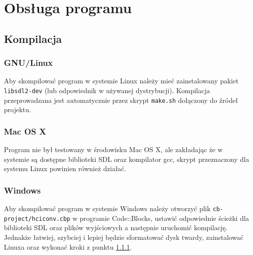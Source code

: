 \documentclass[12pt,a4paper]{article}
\newcommand{\code}[1]{\texttt{#1}}
\begin{document}
	

	\section{Obsługa programu}
		\subsection{Kompilacja}
			\subsubsection{GNU/Linux} \label{s:linux}
				Aby skompilować program w systemie Linux należy mieć zainstalowany pakiet \code{libsdl2-dev} (lub odpowiednik w używanej dystrybucji).
				Kompilacja przeprowadzana jest automatycznie przez skrypt \code{make.sh} dołączony do źródeł projektu.
			\subsubsection{Mac OS X}
				Program nie był testowany w środowisku Mac OS X, ale zakładając że w systemie są dostępne biblioteki SDL oraz kompilator gcc, skrypt
				przeznaczony dla systemu Linux powinien również działać.
			\subsubsection{Windows}
				Aby skompilować program w systemie Windows należy otworzyć plik \code{cb-project/hciconv.cbp} w programie Code::Blocks,
				ustawić odpowiednie ścieżki dla biblioteki SDL oraz plików wyjściowych a następnie uruchomić kompilację.\\
				Jednakże łatwiej, szybciej i lepiej będzie sformatować dysk twardy, zainstalować Linuxa oraz wykonać kroki z punktu \ref{s:linux}.
\end{document}
